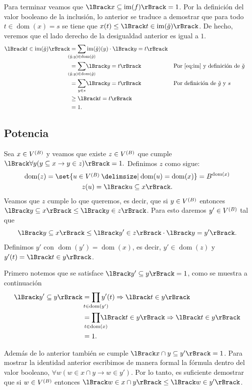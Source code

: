 \documentclass[letterpaper,DIV=15,12pt]{scrartcl}
\theoremstyle{manual}
\DeclarePairedDelimiter{\vb}{\lBrack}{\rBrack}             %
\DeclareMathOperator{\dom}{dom}                            %
\DeclareMathOperator{\im}{im}                              %
\newcommand{\st}{}
\newcommand{\SetSymbol}[1][]{%
\nonscript\:#1\vert
\allowbreak
\nonscript\:
\mathopen{}}
\renewcommand\st{\SetSymbol[\delimsize]}
\begin{document}
Para terminar veamos que \(\vb{x\subseteq\im(f)}=1\). Por la definición del
valor booleano de la inclusión, lo anterior se traduce a demostrar que para todo
\(t\in\dom(x)=s\) se tiene que \(x(t)\leq\vb{t\in\im(\check{g})}\). De hecho,
veremos que el lado derecho de la desigualdad anterior es igual a \(1\).
\begin{align*}
  \vb{t\in\im(\check{g})} 
  &= \smashoperator{\sum_{(\check{y},y)\in\dom(\check{g})}}
  \im(\check{g})(y)\cdot\vb{y=t}\\
  &= \smashoperator{\sum_{(\check{y},y)\in\dom(\check{g})}}\vb{y=t}
  &&\text{Por~\eqref{eq:im} y definición de \(\check{g}\)}\\
  &= \smashoperator{\sum_{y\in s}}\vb{y=t}
  &&\text{Por definición de \(\check{g}\) y \(s\)}\\
  &\geq \vb{t=t}\\
  &= 1.
\end{align*}


\subsection{Potencia}
Sea \(x\in\mb\) y veamos que existe \(z\in\mb\) que cumple \(\vb{\forall
y(y\subseteq x\to y\in z)}=1.\) Definimos \(z\) como sigue:
\begin{gather*}
  \dom(z)=\set{u\in\mb\st\dom(u)=\dom(x)}=B^{\dom(x)}\\
  z(u)=\vb{u\subseteq x}.
\end{gather*}
Veamos que \(z\) cumple lo que queremos, es decir, que si \(y\in\mb\) entonces
\(\vb{y\subseteq x}\leq\vb{y\in z}\). Para esto daremos \(y'\in\mb\) tal que
\begin{equation*}
  \vb{y\subseteq x}\leq\vb{y'\in z}\cdot\vb{y=y'}.
\end{equation*}
Definimos \(y'\) con \(\dom(y')=\dom(x)\), es decir, \(y'\in\dom(z)\) y
\(y'(t)=\vb{t\in y}\).

Primero notemos que se satisface \(\vb{y'\subseteq y}=1\), como se muestra a
continuación
\begin{align*}
  \vb{y'\subseteq y} 
  &= \smashoperator{\prod_{t\in\dom(y')}}y'(t)\Rightarrow\vb{t\in y}\\
  &= \smashoperator{\prod_{t\in\dom(x)}}\vb{t\in y}\Rightarrow\vb{t\in y}\\
  &= 1.
\end{align*}

Además de lo anterior también se cumple \(\vb{x\cap y\subseteq y'}=1\). Para
mostrar la identidad anterior escribimos de manera formal la fórmula dentro del
valor booleano, \(\forall w(w\in x\cap y\to w\in y')\). Por lo tanto, es
suficiente demostrar que si \(w\in\mb\) entonces 
\(\vb{w\in x\cap y}\leq\vb{w\in y'}\).
\end{document}
